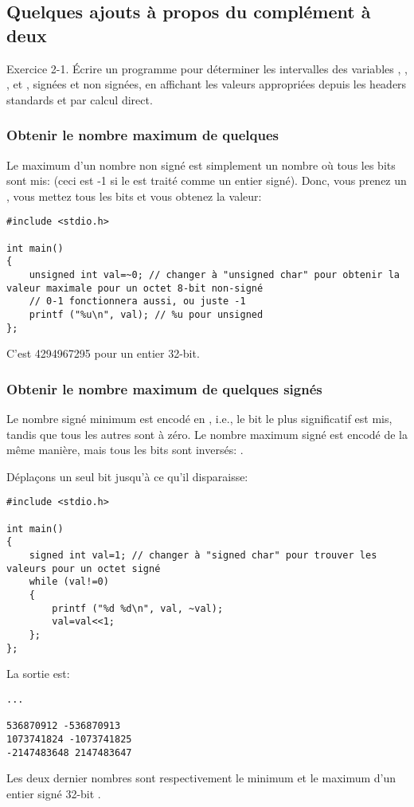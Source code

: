 \subsection{Quelques ajouts à propos du complément à deux}

\epigraph{Exercice 2-1. Écrire un programme pour déterminer les intervalles des variables
, , , et , signées et non signées, en affichant
les valeurs appropriées depuis les headers standards et par calcul direct.}{\KRBook}

\subsubsection{Obtenir le nombre maximum de quelques }

Le maximum d'un nombre non signé est simplement un nombre où tous les bits sont mis:
 (ceci est -1 si le  est traité comme un entier
signé).
Donc, vous prenez un , vous mettez tous les bits et vous obtenez
la valeur:

\begin{lstlisting}[style=customc]
#include <stdio.h>

int main()
{
	unsigned int val=~0; // changer à "unsigned char" pour obtenir la valeur maximale pour un octet 8-bit non-signé
	// 0-1 fonctionnera aussi, ou juste -1
	printf ("%u\n", val); // %u pour unsigned
};
\end{lstlisting}

C'est 4294967295 pour un entier 32-bit.

\subsubsection{Obtenir le nombre maximum de quelques  signés}

Le nombre signé minimum est encodé en , i.e., le bit le plus significatif
est mis, tandis que tous les autres sont à zéro.
Le nombre maximum signé est encodé de la même manière, mais tous les bits sont
inversés: .

Déplaçons un seul bit jusqu'à ce qu'il disparaisse:

\begin{lstlisting}[style=customc]
#include <stdio.h>

int main()
{
	signed int val=1; // changer à "signed char" pour trouver les valeurs pour un octet signé
	while (val!=0)
	{
		printf ("%d %d\n", val, ~val);
		val=val<<1;
	};
};
\end{lstlisting}

La sortie est:

\begin{lstlisting}
...

536870912 -536870913
1073741824 -1073741825
-2147483648 2147483647
\end{lstlisting}

Les deux dernier nombres sont respectivement le minimum et le maximum d'un entier
signé 32-bit .

